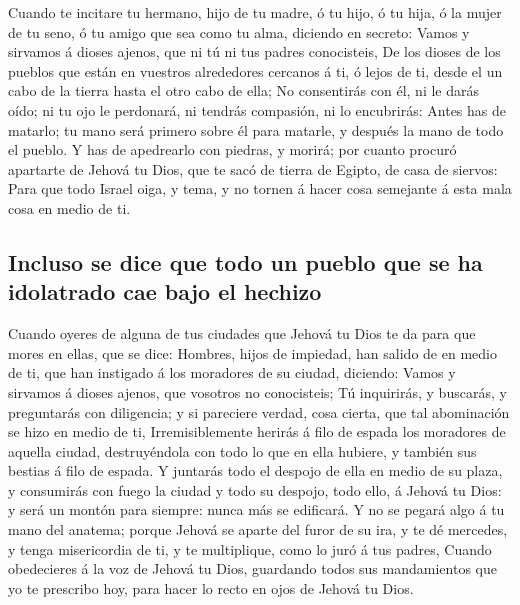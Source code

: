 Cuando te incitare tu hermano, hijo de tu madre, ó tu hijo,
ó tu hija, ó la mujer de tu seno, ó tu amigo que sea como tu alma,
diciendo en secreto: Vamos y sirvamos á dioses ajenos, que ni tú ni tus
padres conocisteis,  De los dioses de los pueblos que están
en vuestros alrededores cercanos á ti, ó lejos de ti, desde el un cabo
de la tierra hasta el otro cabo de ella;  No consentirás con
él, ni le darás oído; ni tu ojo le perdonará, ni tendrás compasión, ni
lo encubrirás:  Antes has de matarlo; tu mano será primero
sobre él para matarle, y después la mano de todo el pueblo.
 Y has de apedrearlo con piedras, y morirá; por cuanto
procuró apartarte de Jehová tu Dios, que te sacó de tierra de Egipto, de
casa de siervos:  Para que todo Israel oiga, y tema, y no
tornen á hacer cosa semejante á esta mala cosa en medio de ti.

\hypertarget{incluso-se-dice-que-todo-un-pueblo-que-se-ha-idolatrado-cae-bajo-el-hechizo}{%
\subsection{Incluso se dice que todo un pueblo que se ha idolatrado cae
bajo el
hechizo}\label{incluso-se-dice-que-todo-un-pueblo-que-se-ha-idolatrado-cae-bajo-el-hechizo}}

 Cuando oyeres de alguna de tus ciudades que Jehová tu Dios
te da para que mores en ellas, que se dice:  Hombres, hijos
de impiedad, han salido de en medio de ti, que han instigado á los
moradores de su ciudad, diciendo: Vamos y sirvamos á dioses ajenos, que
vosotros no conocisteis;  Tú inquirirás, y buscarás, y
preguntarás con diligencia; y si pareciere verdad, cosa cierta, que tal
abominación se hizo en medio de ti,  Irremisiblemente
herirás á filo de espada los moradores de aquella ciudad, destruyéndola
con todo lo que en ella hubiere, y también sus bestias á filo de espada.
 Y juntarás todo el despojo de ella en medio de su plaza, y
consumirás con fuego la ciudad y todo su despojo, todo ello, á Jehová tu
Dios: y será un montón para siempre: nunca más se edificará.
 Y no se pegará algo á tu mano del anatema; porque Jehová
se aparte del furor de su ira, y te dé mercedes, y tenga misericordia de
ti, y te multiplique, como lo juró á tus padres,  Cuando
obedecieres á la voz de Jehová tu Dios, guardando todos sus mandamientos
que yo te prescribo hoy, para hacer lo recto en ojos de Jehová tu Dios.

